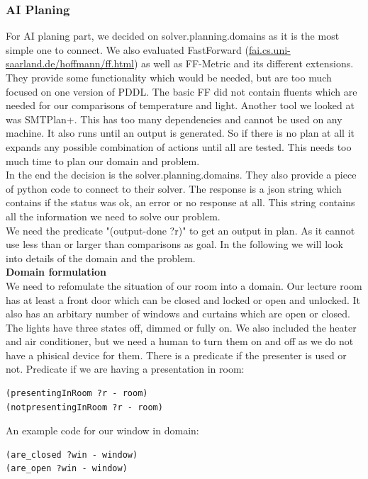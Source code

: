 \documentclass[runningheads]{llncs}
\begin{document}
\subsubsection{AI Planing}\hfill
\label{soft_imp:ai}
\newline
For AI planing part, we decided on solver.planning.domains as it is the most simple one to connect. We also evaluated FastForward (\url{fai.cs.uni-saarland.de/hoffmann/ff.html}) as well as FF-Metric and its different extensions. 
They provide some functionality which would be needed, but are too much focused on one version of PDDL. The basic FF did not contain fluents which are needed for our comparisons of temperature and light. 
Another tool we looked at was SMTPlan+. This has too many dependencies and cannot be used on any machine. It also runs until an output is generated. So if there is no plan at all it expands any possible combination of actions until all are tested. This needs too much time to plan our domain and problem. \\
In the end the decision is the solver.planning.domains. They also provide a piece of python code to connect to their solver. The response is a json string which contains if the status was ok, an error or no response at all.
This string contains all the information we need to solve our problem. \\
We need the predicate "(output-done ?r)" to get an output in plan. As it cannot use less than or larger than comparisons as goal. In the following we will look into details of the domain and the problem.\\
\newline
\textbf{Domain formulation}\\
We need to refomulate the situation of our room into a domain. 
Our lecture room has at least a front door which can be closed and locked or open and unlocked. It also has an arbitary number of windows and curtains which are open or closed. The lights have three states off, dimmed or fully on. We also included the heater and air conditioner, but we need a human to turn them on and off as we do not have a phisical device for them. There is a predicate if the presenter is used or not.
\newline
Predicate if we are having a presentation in room:
\begin{lstlisting}
(presentingInRoom ?r - room)
(notpresentingInRoom ?r - room)
\end{lstlisting}
An example code for our window in domain:
\begin{lstlisting}
(are_closed ?win - window)
(are_open ?win - window)
\end{lstlisting}
\end{document}
